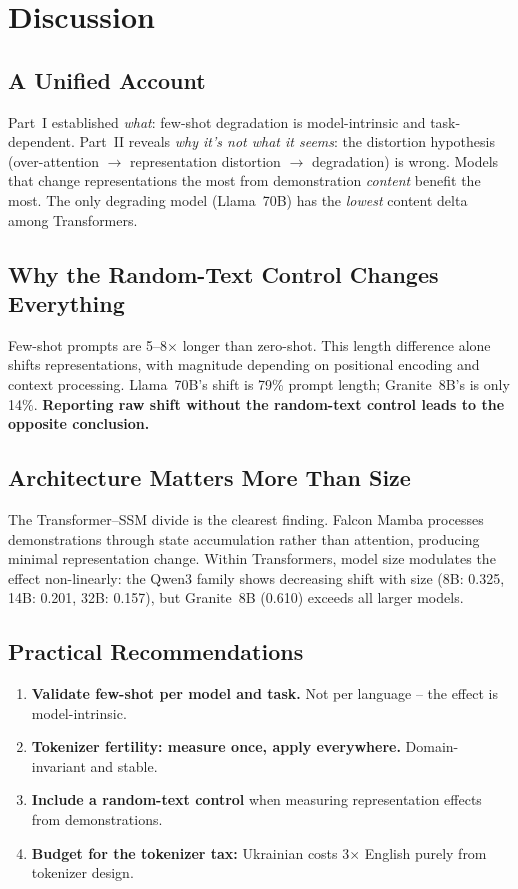 \documentclass[11pt,a4paper]{article}
\begin{document}
\section{Discussion}

\subsection{A Unified Account}

Part~I established \emph{what}: few-shot degradation is model-intrinsic and task-dependent. Part~II reveals \emph{why it's not what it seems}: the distortion hypothesis (over-attention $\rightarrow$ representation distortion $\rightarrow$ degradation) is wrong. Models that change representations the most from demonstration \emph{content} benefit the most. The only degrading model (Llama~70B) has the \emph{lowest} content delta among Transformers.

\subsection{Why the Random-Text Control Changes Everything}

Few-shot prompts are 5--8$\times$ longer than zero-shot. This length difference alone shifts representations, with magnitude depending on positional encoding and context processing. Llama~70B's shift is 79\% prompt length; Granite~8B's is only 14\%. \textbf{Reporting raw shift without the random-text control leads to the opposite conclusion.}

\subsection{Architecture Matters More Than Size}

The Transformer--SSM divide is the clearest finding. Falcon Mamba processes demonstrations through state accumulation rather than attention, producing minimal representation change. Within Transformers, model size modulates the effect non-linearly: the Qwen3 family shows decreasing shift with size (8B: 0.325, 14B: 0.201, 32B: 0.157), but Granite~8B (0.610) exceeds all larger models.

\subsection{Practical Recommendations}

\begin{enumerate}[leftmargin=*]
    \item \textbf{Validate few-shot per model and task.} Not per language -- the effect is model-intrinsic.
    \item \textbf{Tokenizer fertility: measure once, apply everywhere.} Domain-invariant and stable.
    \item \textbf{Include a random-text control} when measuring representation effects from demonstrations.
    \item \textbf{Budget for the tokenizer tax:} Ukrainian costs 3$\times$ English purely from tokenizer design.
\end{enumerate}
\end{document}
